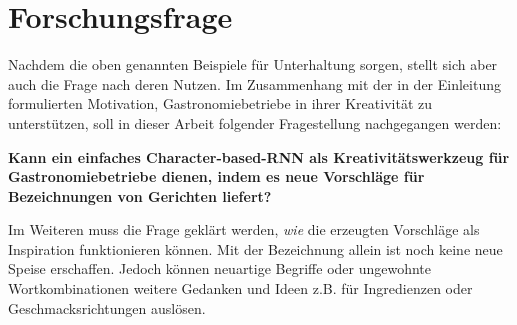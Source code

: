 \section*{Forschungsfrage}
\label{sec:hypotehsis}

Nachdem die oben genannten Beispiele für Unterhaltung sorgen, stellt sich aber auch die Frage nach deren Nutzen.
Im Zusammenhang mit der in der Einleitung formulierten Motivation, Gastronomiebetriebe in ihrer Kreativität zu unterstützen, soll in
dieser Arbeit folgender Fragestellung nachgegangen werden:

\textbf{\guillemotleft Kann ein einfaches Character-based-RNN als Kreativitätswerkzeug für Gastronomiebetriebe dienen, indem es
neue Vorschläge für Bezeichnungen von Gerichten liefert?\guillemotright{}}

Im Weiteren muss die Frage geklärt werden, \textit{wie} die erzeugten Vorschläge als Inspiration funktionieren können.
Mit der Bezeichnung allein ist noch keine neue Speise erschaffen.
Jedoch können neuartige Begriffe oder ungewohnte Wortkombinationen weitere Gedanken und Ideen z.B. für Ingredienzen oder Geschmacksrichtungen auslösen.


